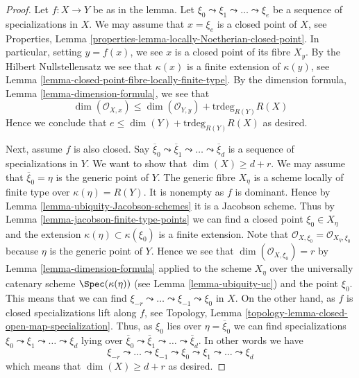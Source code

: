 \begin{proof}
Let $f : X \to Y$ be as in the lemma.
Let $\xi_0 \leadsto \xi_1 \leadsto \ldots \leadsto \xi_e$ be
a sequence of specializations in $X$. We may assume that $x = \xi_e$
is a closed point of $X$, see
Properties, Lemma \ref{properties-lemma-locally-Noetherian-closed-point}.
In particular, setting $y = f(x)$, we see $x$ is a closed point of its fibre
$X_y$. By the Hilbert Nullstellensatz we see that $\kappa(x)$ is a finite
extension of $\kappa(y)$, see
Lemma \ref{lemma-closed-point-fibre-locally-finite-type}.
By the dimension formula, Lemma \ref{lemma-dimension-formula},
we see that
$$
\dim(\mathcal{O}_{X, x}) \leq \dim(\mathcal{O}_{Y, y}) +
\text{trdeg}_{R(Y)} R(X)
$$
Hence we conclude that $e \leq \dim(Y) + \text{trdeg}_{R(Y)} R(X)$ as desired.

\medskip\noindent
Next, assume $f$ is also closed.
Say $\overline{\xi}_0 \leadsto \overline{\xi}_1 \leadsto \ldots
\leadsto \overline{\xi}_d$ is a sequence of specializations in $Y$.
We want to show that $\dim(X) \geq d + r$.
We may assume that $\overline{\xi}_0 = \eta$ is the generic point of $Y$.
The generic fibre $X_\eta$ is a scheme locally of finite type over
$\kappa(\eta) = R(Y)$. It is nonempty as $f$ is dominant. Hence by
Lemma \ref{lemma-ubiquity-Jacobson-schemes} it is a Jacobson scheme.
Thus by Lemma \ref{lemma-jacobson-finite-type-points}
we can find a closed point $\xi_0 \in X_\eta$ and the extension
$\kappa(\eta) \subset \kappa(\xi_0)$ is
a finite extension. Note that
$\mathcal{O}_{X, \xi_0} = \mathcal{O}_{X_\eta, \xi_0}$ because
$\eta$ is the generic point of $Y$. Hence we see that
$\dim(\mathcal{O}_{X, \xi_0}) = r$ by Lemma \ref{lemma-dimension-formula}
applied to the scheme $X_\eta$ over the universally catenary
scheme $\Spec(\kappa(\eta))$ (see Lemma \ref{lemma-ubiquity-uc})
and the point $\xi_0$. This means that we can find
$\xi_{-r} \leadsto \ldots \leadsto \xi_{-1} \leadsto \xi_0$
in $X$. On the other hand, as $f$ is closed specializations
lift along $f$, see
Topology, Lemma \ref{topology-lemma-closed-open-map-specialization}.
Thus, as $\xi_0$ lies
over $\eta = \overline{\xi}_0$ we can
find specializations $\xi_0 \leadsto \xi_1 \leadsto \ldots \leadsto \xi_d$
lying over $\overline{\xi}_0 \leadsto \overline{\xi}_1 \leadsto \ldots
\leadsto \overline{\xi}_d$. In other words we have
$$
\xi_{-r} \leadsto \ldots \leadsto \xi_{-1} \leadsto \xi_0
\leadsto \xi_1 \leadsto \ldots \leadsto \xi_d
$$
which means that $\dim(X) \geq d + r$ as desired.
\end{proof}












